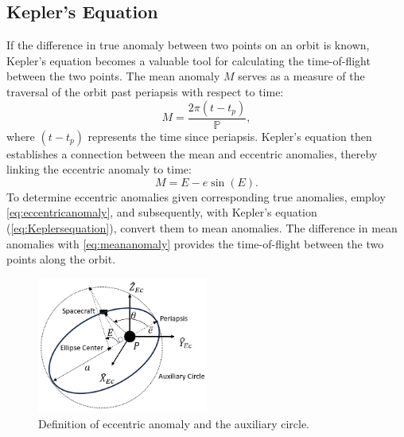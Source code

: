\subsection{Kepler's Equation}
If the difference in true anomaly between two points on an orbit is known, Kepler's equation
becomes a valuable tool for calculating the time-of-flight between the two points. The mean anomaly
$M$ serves as a measure of the traversal of the orbit past periapsis with respect to time:
\begin{equation}
    M=\frac{2\pi(t-t_{p})}{\mathbb{P}},
    \label{eq:meananomaly}
\end{equation}
where $(t-t_{p})$ represents the time since periapsis. Kepler's equation then establishes a
connection between the mean and eccentric anomalies, thereby linking the eccentric anomaly to time:
\begin{equation}
    M=E-e\sin(E).
    \label{eq:Keplersequation}
\end{equation}
To determine eccentric anomalies given corresponding true anomalies, employ
\cref{eq:eccentricanomaly}, and subsequently, with Kepler's equation (\cref{eq:Keplersequation}),
convert them to mean anomalies. The difference in mean anomalies with \cref{eq:meananomaly}
provides the time-of-flight between the two points along the orbit.

\begin{figure}[H]
    \centering
    \includegraphics[width=0.5\textwidth]{figures/AuxCircle.jpg}
    \caption{Definition of eccentric anomaly and the auxiliary circle.}
    \label{fig:auxCircle}
\end{figure}
